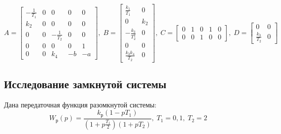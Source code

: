 	\begin{equation}
		A = \begin{bmatrix}
			-\frac{1}{T_1} & 0 & 0 & 0 & 0 \\
			k_2 & 0 & 0 & 0 & 0 \\
			0 & 0 & -\frac{1}{T_2} & 0 & 0 \\
			0 & 0 & 0 & 0 & 1 \\
			0 & 0 & k_4 & -b & -a
		\end{bmatrix},\;
		B = \begin{bmatrix}
			\frac{k_1}{T_1} & 0 \\
			0 & k_2 \\
			-\frac{k_3}{T_2^2} & 0 \\
			0 & 0 \\
			\frac{k_3 k_4}{T_2} & 0		
		\end{bmatrix},\;
		C = \begin{bmatrix}
			0 & 1 & 0 & 1 & 0 \\
			0 & 0 & 1 & 0 & 0
		\end{bmatrix},\;
		D = \begin{bmatrix}
			0 & 0 \\
			\frac{k_3}{T_2} & 0
		\end{bmatrix}
		\label{matrices1}
	\end{equation}

	\subsection{Исследование замкнутой системы}
	
	Дана передаточная функция разомкнутой системы:
	\begin{equation}
		W_\text{р} (p) = \frac{k_\text{р} (1 - pT_1)}{\left(1 + p\frac{T_1}{2}\right)(1 + pT_2)},\; T_1 = 0,1,\; T_2 = 2
	\end{equation}
	
